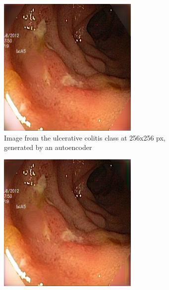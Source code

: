         \begin{figure}[t]
        \centering
        \begin{subfigure}[b]{0.4\textwidth}
            \centering
            \includegraphics[width=\textwidth]{experiments/figures/blackcorner/ucAE.jpg}
            \caption[Is this in use]%
            {{\small Image from the ulcerative colitis class at 256x256 px, generated by an autoencoder }}    
            \label{fig:polypAEBLACK}
        \end{subfigure}
        \qquad
        \begin{subfigure}[b]{0.4\textwidth}  
            \centering 
            \includegraphics[width=\textwidth]{experiments/figures/blackcorner/ucGAN.jpg}

\end{subfigure}
\end{figure}
